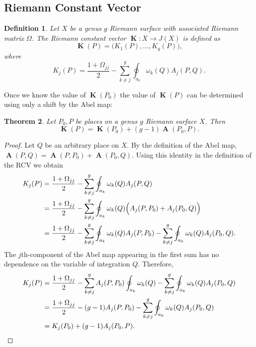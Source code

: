 \documentclass[12pt]{article}
\newtheorem{theorem}{Theorem}
\newtheorem{definition}[theorem]{Definition}
\theoremstyle{definition}
\DeclareMathOperator{\RCV}{\boldsymbol{K}}
\DeclareMathOperator{\Abel}{\boldsymbol{A}}
\begin{document}
\subsection{Riemann Constant Vector}


\begin{definition} \label{def:rcv}
Let $X$ be a genus $g$ Riemann surface with associated Riemann matrix
$\Omega$. The Riemann constant vector $\RCV : X \to J(X)$ is defined as
\begin{equation} \label{eqn:rcv1}
  \RCV(P) = \big( K_1(P), \ldots, K_g(P) \big),
\end{equation}
where
\begin{equation} \label{eqn:rcv2}
  K_j(P) = \frac{1 + \Omega_{jj}}{2} - \sum_{k \neq j}^g
           \oint_{a_k} \omega_k(Q) A_j(P,Q).
\end{equation}
\end{definition}
Once we know the value of $\RCV(P_0)$ the value of $\RCV(P)$ can be
determined using only a shift by the Abel map:
\begin{theorem} \label{thm:RCVshift}
  Let $P_0,P$ be places on a genus $g$ Riemann surface $X$. Then
  \begin{equation} \label{eqn:RCVshift}
    \RCV(P) = \RCV(P_0) + (g-1)\Abel(P_0,P).
  \end{equation}
\end{theorem}
\begin{proof}
Let $Q$ be an arbitrary place on $X$. By the definition of the Abel map,
$\Abel(P,Q) = \Abel(P,P_0) + \Abel(P_0,Q)$. Using this identity in the
definition of the RCV we obtain
\begin{align} \label{eqn:RCVshift1}
  K_j(P)
  &=
  \frac{1 + \Omega_{jj}}{2}
  -
  \sum_{k \neq j}^g
  \oint_{a_k} \omega_k(Q) A_j(P,Q)  \notag \\
  &=
  \frac{1 + \Omega_{jj}}{2}
  -
  \sum_{k \neq j}^g
  \oint_{a_k} \omega_k(Q) \Big( A_j(P,P_0) + A_j(P_0,Q) \Big)  \notag \\
  &=
  \frac{1 + \Omega_{jj}}{2}
  -
  \sum_{k \neq j}^g
  \oint_{a_k} \omega_k(Q) A_j(P,P_0)
  -
  \sum_{k \neq j}^g
  \oint_{a_k} \omega_k(Q) A_j(P_0,Q).
\end{align}
The $j$th-component of the Abel map appearing in the first sum has no
dependence on the variable of integration $Q$. Therefore,
\begin{align} \label{eqn:RCVshift2}
  K_j(P)
  &=
  \frac{1 + \Omega_{jj}}{2}
  -
  \sum_{k \neq j}^g
  A_j(P,P_0)
  \oint_{a_k} \omega_k(Q)
  -
  \sum_{k \neq j}^g
  \oint_{a_k} \omega_k(Q) A_j(P_0,Q) \notag \\
  &=
  \frac{1 + \Omega_{jj}}{2}
  -
  (g-1) A_j(P,P_0)
  -
  \sum_{k \neq j}^g
  \oint_{a_k} \omega_k(Q) A_j(P_0,Q) \notag \\
  &=
  K_j(P_0) + (g-1)A_j(P_0,P).
\end{align}
\end{proof}
\end{document}
